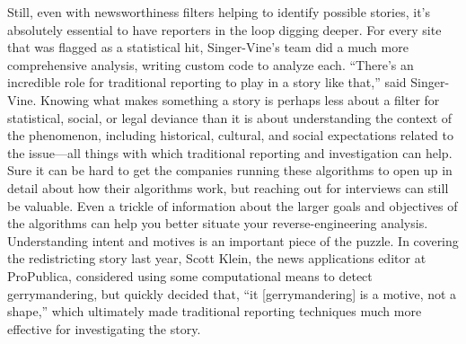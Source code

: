 Still, even with newsworthiness filters helping to identify possible stories, it's absolutely essential to have reporters in the loop digging deeper. For every site that was flagged as a statistical hit, Singer-Vine's team did a much more comprehensive analysis, writing custom code to analyze each. ``There's an incredible role for traditional reporting to play in a story like that,'' said Singer-Vine. Knowing what makes something a story is perhaps less about a filter for statistical, social, or legal deviance than it is about understanding the context of the phenomenon, including historical, cultural, and social expectations related to the issue—all things with which traditional reporting and investigation can help. Sure it can be hard to get the companies running these algorithms to open up in detail about how their algorithms work, but reaching out for interviews can still be valuable. Even a trickle of information about the larger goals and objectives of the algorithms can help you better situate your reverse-engineering analysis. Understanding intent and motives is an important piece of the puzzle. In covering the redistricting story last year, Scott Klein, the news applications editor at ProPublica, considered using some computational means to detect gerrymandering, but quickly decided that, ``it [gerrymandering] is a motive, not a shape,'' which ultimately made traditional reporting techniques much more effective for investigating the story.
